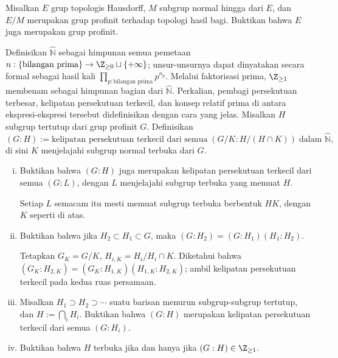 \begin{Exercises}
	\item Misalkan $E$ grup topologis Hausdorff, $M$ subgrup normal hingga dari $E$, dan $E/M$ merupakan grup profinit terhadap topologi hasil bagi. Buktikan bahwa $E$ juga merupakan grup profinit.
	
	\item Definisikan $\hat{\mathbb{N}}$ sebagai himpunan semua pemetaan $n: \{\text{bilangan prima}\} \to \Z_{\geq 0} \sqcup \{+\infty\}$; unsur-unsurnya dapat dinyatakan secara formal sebagai hasil kali $\prod_{p: \text{bilangan prima}} p^{n_p}$. Melalui faktorisasi prima, $\Z_{\geq 1}$ membenam sebagai himpunan bagian dari $\hat{\mathbb{N}}$. Perkalian, pembagi persekutuan terbesar, kelipatan persekutuan terkecil, dan konsep relatif prima di antara ekspresi-ekspresi tersebut didefinisikan dengan cara yang jelas. Misalkan $H$ subgrup tertutup dari grup profinit $G$. Definisikan
	\[ (G:H) := \text{kelipatan persekutuan terkecil dari semua}\; (G/K : H/(H \cap K)) \;\text{dalam $\hat{\mathbb{N}}$}, \]
	di sini $K$ menjelajahi subgrup normal terbuka dari $G$.
	\begin{enumerate}[(i)]
		\item Buktikan bahwa $(G:H)$ juga merupakan kelipatan persekutuan terkecil dari semua $(G:L)$, dengan $L$ menjelajahi subgrup terbuka yang memuat $H$.
		\begin{hint}
			Setiap $L$ semacam itu mesti memuat subgrup terbuka berbentuk $HK$, dengan $K$ seperti di atas.
		\end{hint}
		\item Buktikan bahwa jika $H_2 \subset H_1 \subset G$, maka $(G:H_2) = (G:H_1) (H_1: H_2)$.
		
		\begin{hint}
			Tetapkan $G_K = G/K$, $H_{i, K} = H_i/H_i \cap K$. Diketahui bahwa $(G_K: H_{2, K}) = (G_K: H_{1, K}) (H_{1, K} : H_{2, K})$; ambil kelipatan persekutuan terkecil pada kedua ruas persamaan.
		\end{hint}
		\item Misalkan $H_1 \supset H_2 \supset \cdots$ suatu barisan menurun subgrup-subgrup tertutup, dan $H := \bigcap_i H_i$. Buktikan bahwa $(G:H)$ merupakan kelipatan persekutuan terkecil dari semua $(G:H_i)$.
		\item Buktikan bahwa $H$ terbuka jika dan hanya jika $(G:H) \in \Z_{\geq 1}$.
	\end{enumerate}


\end{Exercises}

